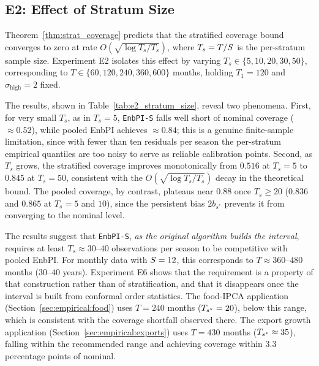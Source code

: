 \subsection{E2: Effect of Stratum Size}
\label{sec:simulations:e2}

Theorem~\ref{thm:strat_coverage} predicts that the stratified
coverage bound converges to zero at rate $O(\sqrt{\log T_s / T_s})$,
where $T_s = T/S$ is the per-stratum sample size.
Experiment E2 isolates this effect by varying $T_s \in
\{5, 10, 20, 30, 50\}$, corresponding to $T \in \{60, 120, 240,
360, 600\}$ months, holding $T_1 = 120$ and
$\sigma_{\mathrm{high}} = 2$ fixed.



The results, shown in Table~\ref{tab:e2_stratum_size}, reveal two
phenomena.  First, for very small $T_s$, as in $T_s = 5$,
\texttt{EnbPI-S} falls well short of nominal coverage
($\approx 0.52$), while pooled EnbPI achieves $\approx 0.84$; this is
a genuine finite-sample limitation, since with fewer than ten
residuals per season the per-stratum empirical quantiles are too
noisy to serve as reliable calibration points.  Second, as $T_s$
grows, the stratified coverage improves monotonically from $0.516$ at
$T_s = 5$ to $0.845$ at $T_s = 50$, consistent with the
$O(\sqrt{\log T_s / T_s})$ decay in the theoretical bound.  The
pooled coverage, by contrast, plateaus near $0.88$ once
$T_s \geq 20$ ($0.836$ and $0.865$ at $T_s = 5$ and $10$), since the
persistent bias $2b_{s^*}$ prevents it from converging to the
nominal level.

\begin{remark}
\label{rem:min_ts}
The results suggest that \texttt{EnbPI-S}, \emph{as the original
algorithm builds the interval}, requires at least
$T_s \approx 30$--$40$ observations per season to be competitive
with pooled EnbPI.  For monthly data with $S = 12$, this
corresponds to $T \approx 360$--$480$ months ($30$--$40$ years).
Experiment E6 shows that the requirement is a property of that
construction rather than of stratification, and that it disappears
once the interval is built from conformal order statistics.
The food-IPCA application (Section~\ref{sec:empirical:food})
uses $T = 240$ months ($T_{s^*} = 20$), below this range, which
is consistent with the coverage shortfall observed there.
The export growth application (Section~\ref{sec:empirical:exports})
uses $T = 430$ months ($T_{s^*} \approx 35$), falling within the
recommended range and achieving coverage within $3.3$ percentage
points of nominal.
\end{remark}

